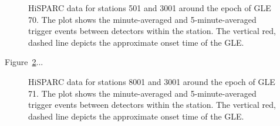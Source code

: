 \begin{figure}[h]
	\centering
	
	\caption{HiSPARC data for stations 501 and 3001 around the epoch of GLE 70. The plot shows the minute-averaged and 5-minute-averaged trigger events between detectors within the station. The vertical red, dashed line depicts the approximate onset time of the GLE.}
	\label{fig:GLE_70}
\end{figure}


Figure~\ref{fig:GLE_71}...

\begin{figure}[h]
	\centering
	
	\caption{HiSPARC data for stations 8001 and 3001 around the epoch of GLE 71. The plot shows the minute-averaged and 5-minute-averaged trigger events between detectors within the station. The vertical red, dashed line depicts the approximate onset time of the GLE.}
	\label{fig:GLE_71}
\end{figure}


